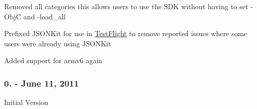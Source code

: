 \begin{DoxyItemize}
\item Removed all categories this allows users to use the S\-D\-K without having to set -\/\-Obj\-C and -\/load\-\_\-all
\item Prefixed J\-S\-O\-N\-Kit for use in \hyperlink{interface_test_flight}{Test\-Flight} to remove reported issues where some users were already using J\-S\-O\-N\-Kit
\item Added support for armv6 again
\end{DoxyItemize}

\subsubsection*{0. -\/ June 11, 2011}


\begin{DoxyItemize}
\item Initial Version 
\end{DoxyItemize}